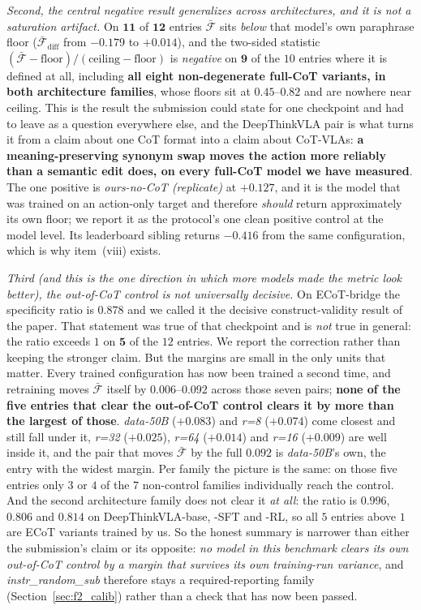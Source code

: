 \documentclass{article}
\begin{document}
\emph{Second, the central negative result generalizes across architectures, and it is not a saturation artifact.} On $\mathbf{11}$ of $\mathbf{12}$ entries $\bar{\mathcal{F}}$ sits \emph{below} that model's own paraphrase floor ($\bar{\mathcal{F}}_{\text{diff}}$ from $-0.179$ to $+0.014$), and the two-sided statistic $(\bar{\mathcal{F}} - \text{floor})/(\text{ceiling} - \text{floor})$ is \emph{negative} on $\mathbf{9}$ of the $10$ entries where it is defined at all, including \textbf{all eight non-degenerate full-CoT variants, in both architecture families}, whose floors sit at $0.45$--$0.82$ and are nowhere near ceiling. This is the result the submission could state for one checkpoint and had to leave as a question everywhere else, and the DeepThinkVLA pair is what turns it from a claim about one CoT format into a claim about CoT-VLAs: \textbf{a meaning-preserving synonym swap moves the action more reliably than a semantic edit does, on every full-CoT model we have measured}. The one positive is \emph{ours-no-CoT (replicate)} at $+0.127$, and it is the model that was trained on an action-only target and therefore \emph{should} return approximately its own floor; we report it as the protocol's one clean positive control at the model level. Its leaderboard sibling returns $-0.416$ from the same configuration, which is why item~(viii) exists.

\emph{Third (and this is the one direction in which more models made the metric look better), the out-of-CoT control is not universally decisive.} On ECoT-bridge the specificity ratio is $0.878$ and we called it the decisive construct-validity result of the paper. That statement was true of that checkpoint and is \emph{not} true in general: the ratio exceeds $1$ on $\mathbf{5}$ of the $12$ entries. We report the correction rather than keeping the stronger claim. But the margins are small in the only units that matter. Every trained configuration has now been trained a second time, and retraining moves $\bar{\mathcal{F}}$ itself by $0.006$--$\mathbf{0.092}$ across those seven pairs; \textbf{none of the five entries that clear the out-of-CoT control clears it by more than the largest of those}. \emph{data-50B} ($+0.083$) and \emph{r=8} ($+0.074$) come closest and still fall under it, \emph{r=32} ($+0.025$), \emph{r=64} ($+0.014$) and \emph{r=16} ($+0.009$) are well inside it, and the pair that moves $\bar{\mathcal{F}}$ by the full $0.092$ is \emph{data-50B}'s own, the entry with the widest margin. Per family the picture is the same: on those five entries only $3$ or $4$ of the $7$ non-control families individually reach the control. And the second architecture family does not clear it \emph{at all}: the ratio is $0.996$, $0.806$ and $0.814$ on DeepThinkVLA-base, -SFT and -RL, so all $5$ entries above $1$ are ECoT variants trained by us. So the honest summary is narrower than either the submission's claim or its opposite: \emph{no model in this benchmark clears its own out-of-CoT control by a margin that survives its own training-run variance}, and \emph{instr\_random\_sub} therefore stays a required-reporting family (Section~\ref{sec:f2_calib}) rather than a check that has now been passed.
\end{document}
